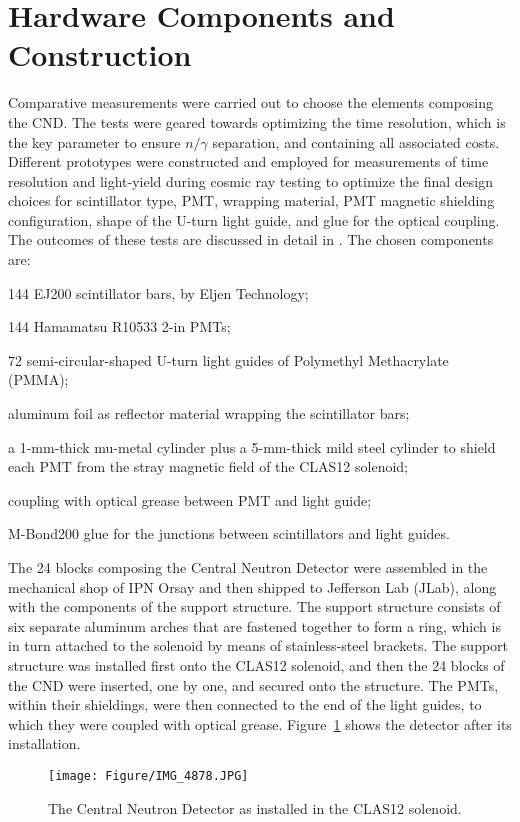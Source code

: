 \section{Hardware Components and Construction}

Comparative measurements were carried out to choose the elements composing the CND. The tests were geared towards optimizing the time resolution, which is the key parameter to ensure $n/\gamma$ separation, and containing all associated costs. 
Different prototypes were constructed and employed for measurements of time resolution and light-yield during cosmic ray testing to optimize the final design choices for scintillator type, PMT, wrapping material, PMT magnetic shielding configuration, shape of the U-turn light guide, and glue for the optical coupling. The outcomes of these tests are discussed in detail in \cite{Niccolai:2018qzm}.
The chosen components are:
\begin{itemize}
\item{144 EJ200 scintillator bars, by Eljen Technology;}
\item{144 Hamamatsu R10533 2-in PMTs;}
\item{72 semi-circular-shaped U-turn light guides of Polymethyl Methacrylate (PMMA);
\item{aluminum foil as reflector material wrapping the scintillator bars;}
}
\item{a 1-mm-thick mu-metal cylinder plus a 5-mm-thick mild steel cylinder to shield each PMT from the stray magnetic field of the CLAS12 solenoid;}
\item{coupling with optical grease between PMT and light guide;}
\item{M-Bond200 glue for the junctions between scintillators and light guides.}
\end{itemize}

The 24 blocks composing the Central Neutron Detector were assembled in the mechanical shop of IPN Orsay \cite{Niccolai:2018qzm} and then shipped to Jefferson Lab (JLab), along with the components of the support structure. The support structure consists of six separate aluminum arches that are fastened together to form a ring, which is in turn attached to the solenoid by means of stainless-steel brackets. 
The support structure was installed first onto the CLAS12 solenoid, and then the 24 blocks of the CND were inserted, one by one, and secured onto the structure. The PMTs, within their shieldings, were then connected to the end of the light guides, to which they were coupled with optical grease. Figure~\ref{photo_cnd_installed} shows the detector after its installation. 
\begin{figure}[htb]
\begin{center}
\texttt{[image: Figure/IMG\_4878.JPG]} 
\end{center}
\caption{The Central Neutron Detector as installed in the CLAS12 solenoid.}
\label{photo_cnd_installed}
\end{figure}
